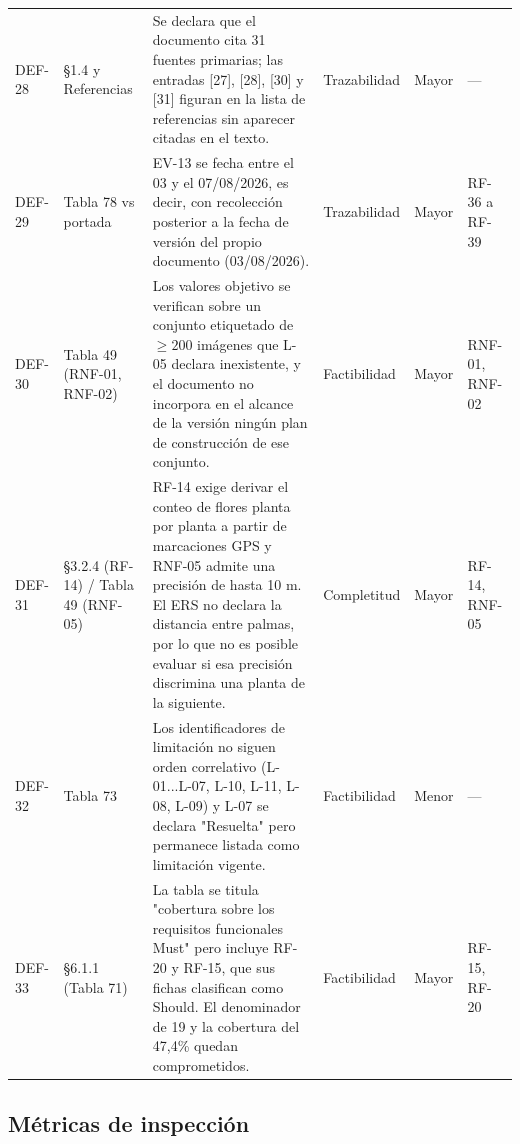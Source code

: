 \documentclass[11pt,letterpaper]{article}
\begin{document}
\begin{longtable}{p{1.0cm} p{1.5cm} p{5.1cm} p{1.9cm} p{2.0cm} p{1.8cm}}
DEF-28 & \S 1.4 y Referencias & Se declara que el documento cita 31 fuentes primarias; las entradas [27], [28], [30] y [31] figuran en la lista de referencias sin aparecer citadas en el texto. & Trazabilidad & Mayor & —\\
DEF-29 & Tabla 78 vs portada & EV-13 se fecha entre el 03 y el 07/08/2026, es decir, con recolección posterior a la fecha de versión del propio documento (03/08/2026). & Trazabilidad & Mayor & RF-36 a RF-39\\
DEF-30 & Tabla 49 (RNF-01, RNF-02) & Los valores objetivo se verifican sobre un conjunto etiquetado de $\geq 200$ imágenes que L-05 declara inexistente, y el documento no incorpora en el alcance de la versión ningún plan de construcción de ese conjunto. & Factibilidad & Mayor & RNF-01, RNF-02\\
DEF-31 & \S 3.2.4 (RF-14) / Tabla 49 (RNF-05) & RF-14 exige derivar el conteo de flores planta por planta a partir de marcaciones GPS y RNF-05 admite una precisión de hasta 10 m. El ERS no declara la distancia entre palmas, por lo que no es posible evaluar si esa precisión discrimina una planta de la siguiente. & Completitud & Mayor & RF-14, RNF-05\\
DEF-32 & Tabla 73 & Los identificadores de limitación no siguen orden correlativo (L-01...L-07, L-10, L-11, L-08, L-09) y L-07 se declara "Resuelta" pero permanece listada como limitación vigente. & Factibilidad & Menor & —\\
DEF-33 & \S 6.1.1 (Tabla 71) & La tabla se titula "cobertura sobre los requisitos funcionales Must" pero incluye RF-20 y RF-15, que sus fichas clasifican como Should. El denominador de 19 y la cobertura del 47,4\% quedan comprometidos. & Factibilidad & Mayor & RF-15, RF-20\\
\end{longtable}

\subsection{Métricas de inspección}
\end{document}
